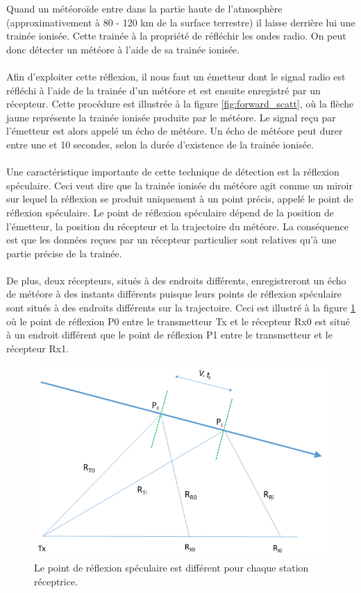 \documentclass[11pt]{article}
\begin{document}
Quand un météoroïde entre dans la partie haute de l'atmosphère (approximativement à 80 - 120 km de la surface terrestre) il laisse derrière lui une trainée ionisée.
Cette trainée à la propriété de réfléchir les ondes radio.
On peut donc détecter un météore à l'aide de sa trainée ionisée.
\\
\\
Afin d'exploiter cette réflexion, il nous faut un émetteur dont le signal radio est réfléchi à l'aide de la trainée d'un météore et est ensuite enregistré par un récepteur.
Cette procédure est illustrée à la figure \ref{fig:forward_scatt}, où la flèche jaune représente la trainée ionisée produite par le météore.
Le signal reçu par l'émetteur est alors appelé un écho de météore.
Un écho de météore peut durer entre une et 10 secondes, selon la durée d'existence de la trainée ionisée.
\\
\\
Une caractéristique importante de cette technique de détection est la réflexion spéculaire.
Ceci veut dire que la trainée ionisée du météore agit comme un miroir sur lequel la réflexion se produit uniquement à un point précis, appelé le point de réflexion spéculaire.
Le point de réflexion spéculaire dépend de la position de l'émetteur, la position du récepteur et la trajectoire du météore.
La conséquence est que les données reçues par un récepteur particulier sont relatives qu'à une partie précise de la trainée.
\\
\\
De plus, deux récepteurs, situés à des endroits différents, enregistreront un écho de météore à des instants différents puisque leurs points de réflexion spéculaire sont situés à des endroits différents sur la trajectoire.
Ceci est illustré à la figure \ref{fig:specular_reflex} où le point de réflexion P0 entre le transmetteur Tx et le récepteur Rx0 est situé à un endroit différent que le point de réflexion P1 entre le transmetteur et le récepteur Rx1.

\begin{figure}[t]
    \begin{center}
        \includegraphics[scale=1]{scema_reflexion_speculaire.png}
        \caption{Le point de réflexion spéculaire est différent pour chaque station réceptrice.}
        \label{fig:specular_reflex}
    \end{center}
\end{figure}
\end{document}
